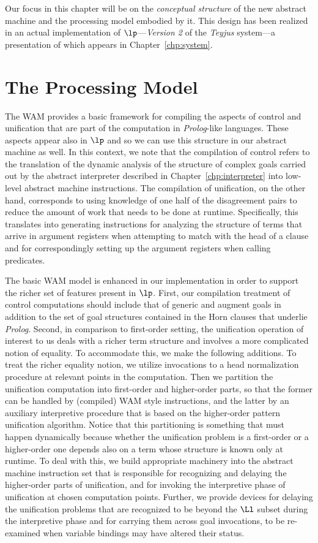Our focus in this chapter will be on
the {\em conceptual structure} of the new abstract machine and the
processing model embodied by it.
This design has been realized in an actual implementation of
$\lp$---{\em Version 2} of the {\it Teyjus} system---a presentation
  of which appears in Chapter~\ref{chp:system}.

\section{The Processing Model}\label{sec:basic_model}
The WAM provides a basic framework for compiling the aspects of
control and unification that are part of the computation in {\em
  Prolog}-like languages. These aspects appear also in $\lp$ and so we
can use this structure in our abstract machine as well.
In this context, we note that the compilation of control refers to the
translation of the dynamic analysis of the structure of complex goals
carried out by the abstract interpreter described in
Chapter~\ref{chp:interpreter} into low-level abstract machine
instructions. The compilation of unification, on the other hand,
corresponds to using knowledge of one half of the disagreement
pairs to reduce the amount of work that needs to be done at
runtime. Specifically, this translates into generating instructions for
analyzing the structure of terms that arrive in argument registers
when attempting to match with the head of a clause and for
correspondingly setting up the argument registers when calling
predicates.


The basic WAM model is enhanced in our implementation in order to
support the richer set of features present in $\lp$.
First, our compilation treatment of control computations should include that
of generic and augment goals in addition to the set of goal structures
contained in the Horn clauses that underlie {\em Prolog}.
Second, in comparison to first-order setting, the unification
operation of interest to us deals with a richer term structure and involves a
more complicated notion of equality. To accommodate this, we make the
following additions. To treat the richer equality notion, we utilize
invocations to a head normalization procedure at relevant points in
the computation. Then we partition the unification computation into
first-order and higher-order parts, so that the former can be handled by
(compiled) WAM style instructions, and the latter by an auxiliary
interpretive procedure that is based on the higher-order pattern
unification algorithm. Notice that this partitioning is something that
must happen dynamically because whether the unification problem is a
first-order or a higher-order one depends also on a term whose
structure is known only at runtime. To deal with this, we build
appropriate machinery into the abstract machine instruction
set that is responsible for recognizing and delaying the higher-order
parts of unification, and for invoking the interpretive phase of
unification at chosen computation points. Further, we provide
devices for delaying the unification problems that are recognized to
be beyond the $\Ll$ subset during the interpretive phase and for
carrying them across goal invocations, to be re-examined when variable
bindings may have altered their status.

